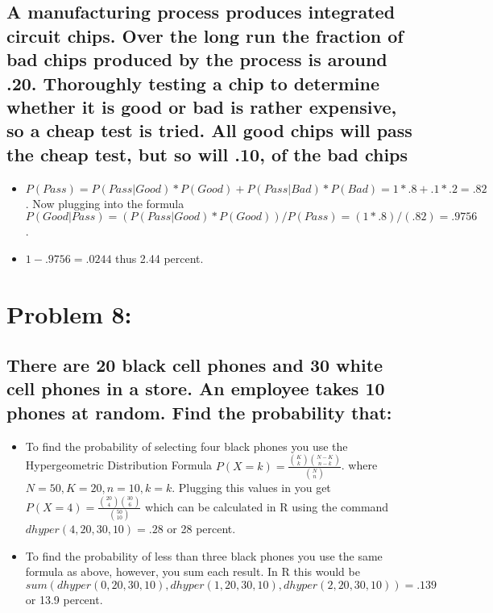 \documentclass{article} %
\begin{document}
\subsection{A manufacturing process produces integrated circuit chips. Over the long run the fraction
of bad chips produced by the process is around .20. Thoroughly testing a chip to determine
whether it is good or bad is rather expensive, so a cheap test is tried. All good chips will
pass the cheap test, but so will .10, of the bad chips}
\begin{itemize}
    \item  \(P(Pass) = P(Pass|Good) * P(Good) + P(Pass|Bad) * P(Bad) = 1 * .8 + .1 * .2 = .82\). Now 
    plugging into the formula \(P(Good|Pass) = (P(Pass|Good) *P(Good)) / P(Pass) = (1*.8)/(.82) = .9756\).
    \item \(1-.9756=.0244\) thus 2.44 percent. 

\end{itemize}

\section{Problem 8:}
\subsection{There are 20 black cell phones and 30 white cell phones in a store. An employee takes
10 phones at random. Find the probability that:}
\begin{itemize}
    \item To find the probability of selecting four black phones you use the Hypergeometric Distribution Formula 
    \(P(X = k) = \frac{\binom{K}{k} \binom{N - K}{n - k}}{\binom{N}{n}}\).
    where \(N = 50, K = 20, n = 10, k = k\). Plugging this values in you get 
    \(P(X = 4) = \frac{\binom{20}{4} \binom{30}{6}}{\binom{50}{10}}\) which can be calculated in R using the command
    \(dhyper(4, 20, 30, 10) = .28\) or 28 percent. 
    \item To find the probability of less than three black phones you use the same formula as above, however, 
    you sum each result. In R this would be \(sum(dhyper(0, 20, 30, 10), dhyper(1, 20, 30, 10), dhyper(2, 20, 30, 10)) = 
    .139\) or 13.9 percent.

\end{itemize}
\end{document}
